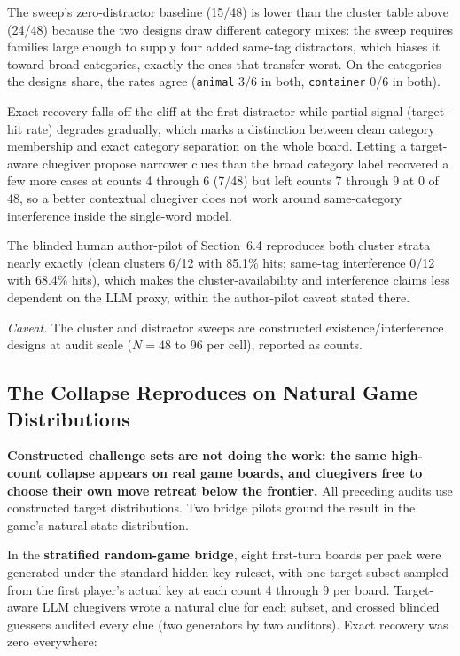 \documentclass[11pt]{article}
\begin{document}
The sweep's zero-distractor baseline (15/48) is lower than the cluster table above
(24/48) because the two designs draw different category mixes: the sweep requires
families large enough to supply four added same-tag distractors, which biases it
toward broad categories, exactly the ones that transfer worst. On the categories
the designs share, the rates agree (\texttt{animal} 3/6 in both,
\texttt{container} 0/6 in both).

Exact recovery falls off the cliff at the first distractor while partial signal
(target-hit rate) degrades gradually, which marks a distinction between clean
category membership and exact category separation on the whole board. Letting a
target-aware cluegiver propose narrower clues than the broad category label
recovered a few more cases at counts 4 through 6 (7/48) but left counts 7 through
9 at 0 of 48, so a better contextual cluegiver does not work around same-category
interference inside the single-word model.

The blinded human author-pilot of Section~6.4 reproduces both cluster strata
nearly exactly (clean clusters 6/12 with 85.1\% hits; same-tag interference 0/12
with 68.4\% hits), which makes the cluster-availability and interference claims
less dependent on the LLM proxy, within the author-pilot caveat stated there.

\emph{Caveat.} The cluster and distractor sweeps are constructed
existence/interference designs at audit scale ($N = 48$ to 96 per cell), reported
as counts.

\subsection{The Collapse Reproduces on Natural Game Distributions}

\textbf{Constructed challenge sets are not doing the work: the same high-count
collapse appears on real game boards, and cluegivers free to choose their own move
retreat below the frontier.} All preceding audits use constructed target
distributions. Two bridge pilots ground the result in the game's natural state
distribution.

In the \textbf{stratified random-game bridge}, eight first-turn boards per pack
were generated under the standard hidden-key ruleset, with one target subset
sampled from the first player's actual key at each count 4 through 9 per board.
Target-aware LLM cluegivers wrote a natural clue for each subset, and crossed
blinded guessers audited every clue (two generators by two auditors). Exact
recovery was zero everywhere:
\end{document}
